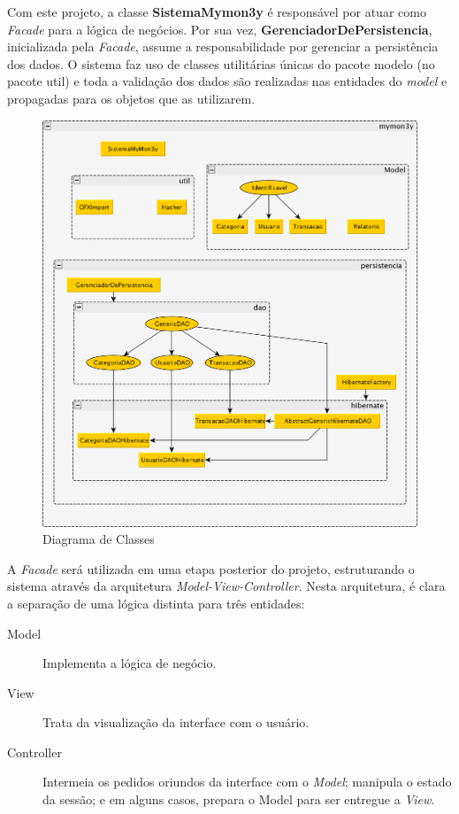 \documentclass[12pt]{article}
\begin{document}
Com este projeto, a classe \textbf{SistemaMymon3y} é responsável por atuar como \textit{Facade} para a lógica de negócios. Por sua vez, \textbf{GerenciadorDePersistencia}, inicializada pela \textit{Facade}, assume a responsabilidade por gerenciar a persistência dos dados. O sistema faz uso de classes utilitárias únicas do pacote modelo (no pacote util) e toda a validação dos dados são realizadas nas entidades do \textit{model} e propagadas para os objetos que as utilizarem.

\begin{figure}[H]
\centering
  \label{arquitetura-fig}
  \includegraphics[scale=0.2, bb=0 0 1462 1583]{arquitetura.png}
  \caption{Diagrama de Classes}
\end{figure}

A \textit{Facade} será utilizada em uma etapa posterior do projeto, estruturando o sistema através da arquitetura \textit{Model-View-Controller}. Nesta arquitetura, é clara a separação de uma lógica distinta para três entidades:

\begin{description}
 \item[Model] Implementa a lógica de negócio.
 \item[View] Trata da visualização da interface com o usuário.
 \item[Controller] Intermeia os pedidos oriundos da interface com o \textit{Model}; manipula o estado da sessão; e em alguns casos, prepara o Model para ser entregue a \textit{View}.
 \end{description}
\end{document}
